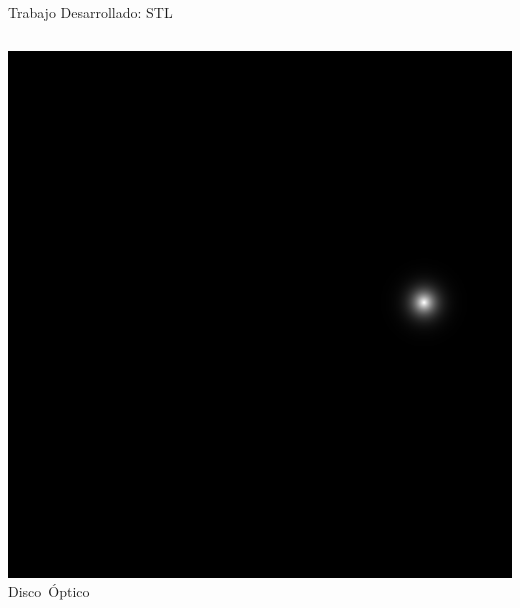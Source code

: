 \documentclass[xcolor=dvipsnames,table]{beamer}
\begin{document}
\begin{frame}{Trabajo Desarrollado: STL}
\begin{columns}[T]
\begin{minipage}[t]{0.35\textwidth}
	\includegraphics[width=\textwidth]{my_images/ML/OD_36.jpg}\\[1ex]
	{\small \mbox{Disco Óptico}}
\end{minipage}

\vspace{1em} %


\end{columns}
\end{frame}
\end{document}
